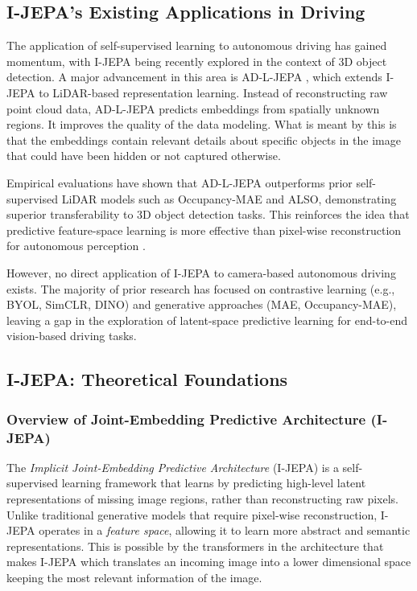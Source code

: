 \documentclass{article}
\begin{document}
\subsection{I-JEPA’s Existing Applications in Driving}

The application of self-supervised learning to autonomous driving has gained momentum, with I-JEPA being recently explored in the context of 3D object detection. A major advancement in this area is AD-L-JEPA \citep{zhu2025adljepa}, which extends I-JEPA to LiDAR-based representation learning. Instead of reconstructing raw point cloud data, AD-L-JEPA predicts embeddings from spatially unknown regions. It improves the quality of the data modeling. What is meant by this is that the embeddings contain relevant details about specific objects in the image that could have been hidden or not captured otherwise. 

Empirical evaluations have shown that AD-L-JEPA outperforms prior self-supervised LiDAR models such as Occupancy-MAE and ALSO, demonstrating superior transferability to 3D object detection tasks. This reinforces the idea that predictive feature-space learning is more effective than pixel-wise reconstruction for autonomous perception \citep{zhu2025adljepa}.

However, no direct application of I-JEPA to camera-based autonomous driving exists. The majority of prior research has focused on contrastive learning (e.g., BYOL, SimCLR, DINO) and generative approaches (MAE, Occupancy-MAE), leaving a gap in the exploration of latent-space predictive learning for end-to-end vision-based driving tasks.

\subsection{I-JEPA: Theoretical Foundations}

\subsubsection{Overview of Joint-Embedding Predictive Architecture (I-JEPA)}
The \textit{Implicit Joint-Embedding Predictive Architecture} (I-JEPA) \citep{assran2023ijepa} is a self-supervised learning framework that learns by predicting high-level latent representations of missing image regions, rather than reconstructing raw pixels. Unlike traditional generative models that require pixel-wise reconstruction, I-JEPA operates in a \textit{feature space}, allowing it to learn more abstract and semantic representations. This is possible by the transformers in the architecture that makes I-JEPA which translates an incoming image into a lower dimensional space keeping the most relevant information of the image. 
\end{document}

